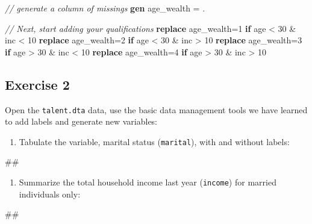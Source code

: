 \documentclass[
]{book}
\newenvironment{Shaded}{\begin{snugshade}}{\end{snugshade}}
\newcommand{\CommentTok}[1]{\textcolor[rgb]{0.56,0.35,0.01}{\textit{#1}}}
\newcommand{\KeywordTok}[1]{\textcolor[rgb]{0.13,0.29,0.53}{\textbf{#1}}}
\newcommand{\NormalTok}[1]{#1}
\providecommand{\tightlist}{%
  \setlength{\itemsep}{0pt}\setlength{\parskip}{0pt}}
\begin{document}
\begin{Shaded}
\begin{Highlighting}[]
\CommentTok{// generate a column of missings}
\KeywordTok{gen}\NormalTok{ age\_wealth = .}

\CommentTok{// Next, start adding your qualifications}
\KeywordTok{replace}\NormalTok{ age\_wealth=1 }\KeywordTok{if}\NormalTok{ age \textless{} 30 \& inc \textless{} 10}
\KeywordTok{replace}\NormalTok{ age\_wealth=2 }\KeywordTok{if}\NormalTok{ age \textless{} 30 \& inc \textgreater{} 10}
\KeywordTok{replace}\NormalTok{ age\_wealth=3 }\KeywordTok{if}\NormalTok{ age \textgreater{} 30 \& inc \textless{} 10}
\KeywordTok{replace}\NormalTok{ age\_wealth=4 }\KeywordTok{if}\NormalTok{ age \textgreater{} 30 \& inc \textgreater{} 10}
\end{Highlighting}
\end{Shaded}

\hypertarget{exercise-2-4}{%
\subsection{Exercise 2}\label{exercise-2-4}}

Open the \texttt{talent.dta} data, use the basic data management tools we have learned to add labels and generate new variables:

\begin{enumerate}
\def\labelenumi{\arabic{enumi}.}
\tightlist
\item
  Tabulate the variable, marital status (\texttt{marital}), with and without labels:
\end{enumerate}

\begin{Shaded}
\begin{Highlighting}[]
\NormalTok{\#\#}
\end{Highlighting}
\end{Shaded}

\begin{enumerate}
\def\labelenumi{\arabic{enumi}.}
\setcounter{enumi}{1}
\tightlist
\item
  Summarize the total household income last year (\texttt{income}) for married individuals only:
\end{enumerate}

\begin{Shaded}
\begin{Highlighting}[]
\NormalTok{\#\#}
\end{Highlighting}
\end{Shaded}
\end{document}
